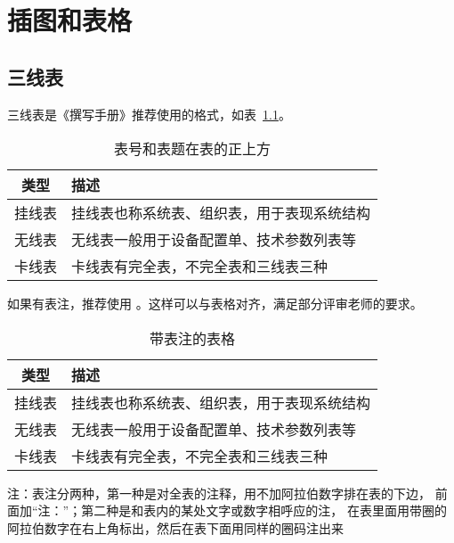 
\chapter{插图和表格}

\section{三线表}

三线表是《撰写手册》推荐使用的格式，如表~\ref{tab:exampletable}。

\begin{table}
  \centering
  \caption{表号和表题在表的正上方}
  \label{tab:exampletable}
  \begin{tabular}{cl}
    \toprule
    类型   & 描述                                       \\
    \midrule
    挂线表 & 挂线表也称系统表、组织表，用于表现系统结构 \\
    无线表 & 无线表一般用于设备配置单、技术参数列表等   \\
    卡线表 & 卡线表有完全表，不完全表和三线表三种       \\
    \bottomrule
  \end{tabular}
\end{table}

如果有表注，推荐使用 。这样可以与表格对齐，满足部分评审老师的要求。

\begin{table}
  \centering
  \begin{threeparttable}
    \caption{带表注的表格}
    \label{tab:tablewithnotes}
    \begin{tabular}{cl}
      \toprule
      类型   & 描述                                       \\
      \midrule
      挂线表 & 挂线表也称系统表、组织表，用于表现系统结构 \\
      无线表 & 无线表一般用于设备配置单、技术参数列表等   \\
      卡线表 & 卡线表有完全表，不完全表和三线表三种       \\
      \bottomrule
    \end{tabular}
    \begin{tablenotes}[flushleft]
      \item 注：表注分两种，第一种是对全表的注释，用不加阿拉伯数字排在表的下边，
      前面加“注：”；第二种是和表内的某处文字或数字相呼应的注，
      在表里面用带圈的阿拉伯数字在右上角标出，然后在表下面用同样的圈码注出来
    \end{tablenotes}
  \end{threeparttable}
\end{table}

